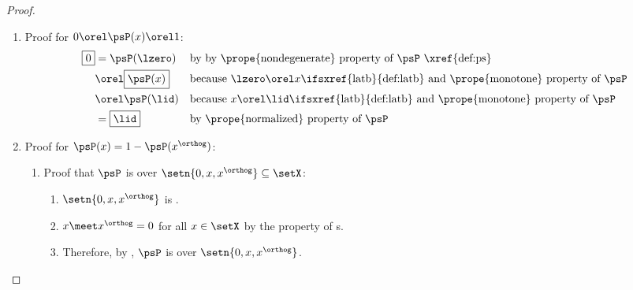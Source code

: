 \begin{proof}
  \begin{enumerate}
    \item Proof for $0\orel\psP(x)\orel 1$:
      \begin{align*}
        \boxed{0}
          &= \psP(\lzero)
          && \text{by by \prope{nondegenerate} property of $\psP$ \xref{def:ps}}
        \\&\orel \boxed{\psP(x)}
          && \text{because $\lzero\orel x$\ifsxref{latb}{def:latb} and \prope{monotone} property of $\psP$}
        \\&\orel \psP(\lid)
          && \text{because $x\orel\lid$\ifsxref{latb}{def:latb} and \prope{monotone} property of $\psP$}
        \\&= \boxed{\lid}
          && \text{by \prope{normalized} property of $\psP$}
      \end{align*}
    \item Proof for $\psP(x)=1-\psP({x^\orthog})$:
      \begin{enumerate}
        \item Proof that $\psP$ is   over $\setn{0,x,x^\orthog}\subseteq\setX$: \label{item:ps_additive}
          \begin{enumerate}
            \item $\setn{0,x,x^\orthog}$ is .
            \item $x\meet x^\orthog=0$ for all $x\in\setX$ by the  property of
                  s.
            \item Therefore, by , $\psP$ is  over $\setn{0,x,x^\orthog}$.
          \end{enumerate}


\end{enumerate}
\end{enumerate}
\end{proof}
